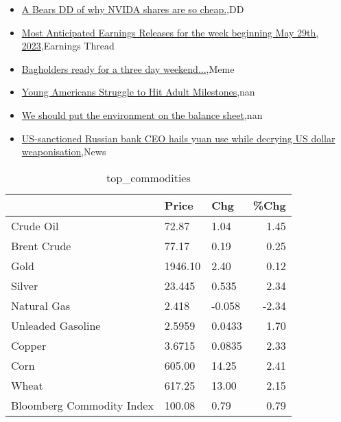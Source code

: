 \documentclass{article}%
\begin{document}
%
\begin{itemize}%
\item%
\href{https://reddit.com/r/wallstreetbets/comments/13t5jzu/a\_bears\_dd\_of\_why\_nvida\_shares\_are\_so\_cheap/}{A Bears DD of why NVIDA shares are so cheap.},DD%
\item%
\href{https://reddit.com/r/wallstreetbets/comments/13t4fe3/most\_anticipated\_earnings\_releases\_for\_the\_week/}{Most Anticipated Earnings Releases for the week beginning May 29th, 2023},Earnings Thread%
\item%
\href{https://reddit.com/r/StockMarket/comments/13snze4/bagholders\_ready\_for\_a\_three\_day\_weekend/}{Bagholders ready for a three day weekend...},Meme%
\item%
\href{https://reddit.com/r/Economics/comments/13skibv/young\_americans\_struggle\_to\_hit\_adult\_milestones/}{Young Americans Struggle to Hit Adult Milestones},nan%
\item%
\href{https://reddit.com/r/Economics/comments/13sgrzg/we\_should\_put\_the\_environment\_on\_the\_balance\_sheet/}{We should put the environment on the balance sheet},nan%
\item%
\href{https://reddit.com/r/Economics/comments/13sf79v/ussanctioned\_russian\_bank\_ceo\_hails\_yuan\_use/}{US-sanctioned Russian bank CEO hails yuan use while decrying US dollar weaponisation},News%
\end{itemize}%


\begin{table}[htbp]%
\caption{top\_commodities}%
\centering%
\begin{adjustbox}{width=1\textwidth}%
\begin{tabular}{lllr}
\toprule
                          &   Price &    Chg &  \%Chg \\
\midrule
               Crude Oil  &   72.87 &   1.04 &  1.45 \\
             Brent Crude  &   77.17 &   0.19 &  0.25 \\
                    Gold  & 1946.10 &   2.40 &  0.12 \\
                  Silver  &  23.445 &  0.535 &  2.34 \\
             Natural Gas  &   2.418 & -0.058 & -2.34 \\
       Unleaded Gasoline  &  2.5959 & 0.0433 &  1.70 \\
                  Copper  &  3.6715 & 0.0835 &  2.33 \\
                    Corn  &  605.00 &  14.25 &  2.41 \\
                   Wheat  &  617.25 &  13.00 &  2.15 \\
Bloomberg Commodity Index &  100.08 &   0.79 &  0.79 \\
\bottomrule
\end{tabular}
%
\end{adjustbox}%
\end{table}
\end{document}
